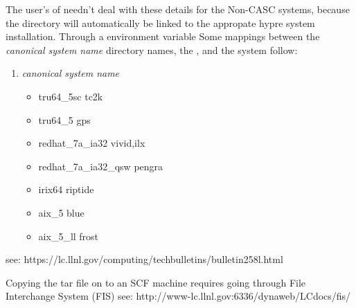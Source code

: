 \begin{enumerate}
   The user's of \hypre{} needn't deal with these details for the 
   Non-CASC systems, because the  directory
   will automatically be linked to the appropate hypre system 
   installation. Through a  environment variable
   Some mappings between the  
   \textit{canonical system name} directory names, the
   , and the system  follow:
\begin{enumerate}
   \item \textit{canonical system name}     
   \begin{itemize}
   \item  {}        tru64\_5sc           tc2k
   \item  {}        tru64\_5             gps
   \item  {}           redhat\_7a\_ia32      vivid,ilx
   \item  {}    redhat\_7a\_ia32\_qsw  pengra
   \item  {}            irix64              riptide
   \item  {}      aix\_5               blue
   \item  {}    aix\_5\_ll            frost
   \end{itemize}
\end{enumerate}
   see: https://lc.llnl.gov/computing/techbulletins/bulletin258l.html

   Copying the tar file on to an SCF machine requires going through
   File Interchange System (FIS) see: 
   http://www-lc.llnl.gov:6336/dynaweb/LCdocs/fis/


\end{enumerate}
